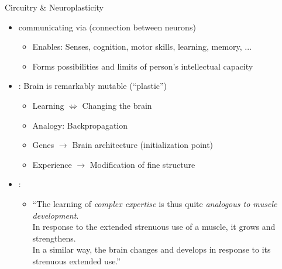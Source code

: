 \documentclass{ercisbeamer}
\begin{document}
\begin{frame}{Circuitry \& Neuroplasticity}
    \begin{tbox}
        \begin{itemize}
            \item {} communicating via  (connection between neurons)
            \begin{itemize}
                \item Enables: Senses, cognition, motor skills, learning, memory, ...
                \item Forms possibilities and limits of person's intellectual capacity
            \end{itemize}
            \item {}: Brain is remarkably mutable (``plastic'')
            \begin{itemize}
                \item Learning $\Leftrightarrow$ Changing the brain
                \item Analogy: Backpropagation 
                \item Genes $\rightarrow$ Brain architecture (initialization point)
                \item Experience $\rightarrow$ Modification of fine structure
            \end{itemize}
        \end{itemize}
    \end{tbox}

    \begin{tbox}
        \begin{itemize}
            \item \citet{wieman12}: 
            \begin{itemize}
                \item ``The learning of \emph{complex expertise} is thus quite \emph{analogous to muscle development}. \\
                In response to the extended strenuous use of a muscle, it grows and strengthens. \\
                In a similar way, the brain changes and develops in response to its strenuous extended use.''
            \end{itemize}
        \end{itemize}
    \end{tbox}


\end{frame}
\end{document}
